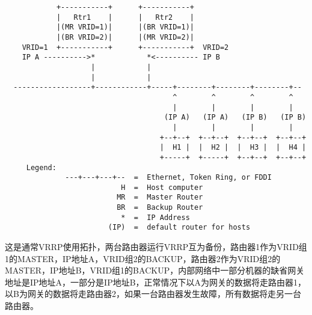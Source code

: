 \begin{verbatim}
            +-----------+      +-----------+
            |   Rtr1    |      |   Rtr2    |
            |(MR VRID=1)|      |(BR VRID=1)|
            |(BR VRID=2)|      |(MR VRID=2)|
    VRID=1  +-----------+      +-----------+  VRID=2
    IP A ---------->*            *<---------- IP B
                    |            |
                    |            |
  ------------------+------------+-----+--------+--------+--------+--
                                       ^        ^        ^        ^
                                       |        |        |        |
                                     (IP A)   (IP A)   (IP B)   (IP B)
                                       |        |        |        |
                                    +--+--+  +--+--+  +--+--+  +--+--+
                                    |  H1 |  |  H2 |  |  H3 |  |  H4 |
                                    +-----+  +-----+  +--+--+  +--+--+
     Legend:
              ---+---+---+--  =  Ethernet, Token Ring, or FDDI
                           H  =  Host computer
                          MR  =  Master Router
                          BR  =  Backup Router
                           *  =  IP Address
                        (IP)  =  default router for hosts
\end{verbatim}

这是通常VRRP使用拓扑，两台路由器运行VRRP互为备份，路由器1作为VRID组1的MASTER，IP地址A，VRID组2的BACKUP，路由器2作为VRID组2的MASTER，IP地址B，VRID组1的BACKUP，内部网络中一部分机器的缺省网关地址是IP地址A，一部分是IP地址B，正常情况下以A为网关的数据将走路由器1，以B为网关的数据将走路由器2，如果一台路由器发生故障，所有数据将走另一台路由器。











